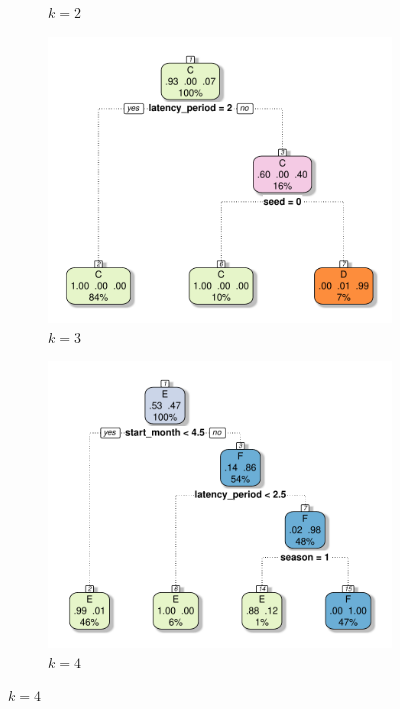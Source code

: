 \documentclass[10pt]{article}
\theoremstyle{definition}
\begin{document}
\begin{figure}[ht]
\begin{subfigure}[b]{.32\textwidth}
\caption{$k=2$}
\end{subfigure}
\begin{subfigure}[b]{.32\textwidth}
\includegraphics[width=\textwidth]{../clustering/results/agglomerative/cart_cCD_agg.pdf}
\caption{$k=3$}
\end{subfigure}
\begin{subfigure}[b]{.32\textwidth}
\includegraphics[width=\textwidth]{../clustering/results/agglomerative/cart_cEF_agg.pdf}
\caption{$k=4$}
\end{subfigure}

\end{figure}
\end{document}

